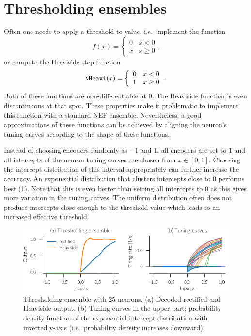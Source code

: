 \section{Thresholding ensembles}\label{sec:thresholding}
Often one needs to apply a threshold to value, i.e.\ implement the function
\begin{equation}
    f(x) = \left\{ \begin{array}{ll}
            0 & x < 0 \\
            x & x \geq 0
        \end{array} \right.
    \text{,}
\end{equation}
or compute the Heaviside step function
\begin{equation}
    \Heavi(x) = \left\{ \begin{array}{ll}
            0 & x < 0 \\
            1 & x \geq 0
        \end{array} \right.
    \text{.}
\end{equation}
Both of these functions are non-differentiable at 0.
The Heaviside function is even discontinuous at that spot.
These properties make it problematic to implement this function with a standard NEF ensemble.
Nevertheless, a good approximations of these functions can be achieved by aligning the neuron's tuning curves according to the shape of these functions.

Instead of choosing encoders randomly as $-1$ and $1$, all encoders are set to $1$ and all intercepts of the neuron tuning curves are chosen from $x \in [0; 1]$.
Choosing the intercept distribution of this interval appropriately can further increase the accuracy.
An exponential distribution that clusters intercepts close to 0 performs best (\cref{fig:thresholding}).
Note that this is even better than setting all intercepts to 0 as this gives more variation in the tuning curves.
The uniform distribution often does not produce intercepts close enough to the threshold value which leads to an increased effective threshold.
\begin{figure}
    \centering
    \includegraphics{figures/thresholding}
    \caption[Thresholding ensemble]{Thresholding ensemble with 25 neurons. (a) Decoded rectified and Heaviside output.  (b) Tuning curves in the upper part; probability density function of the exponential intercept distribution with inverted y-axis (i.e.\ probability density increases downward).}\label{fig:thresholding}
\end{figure}


